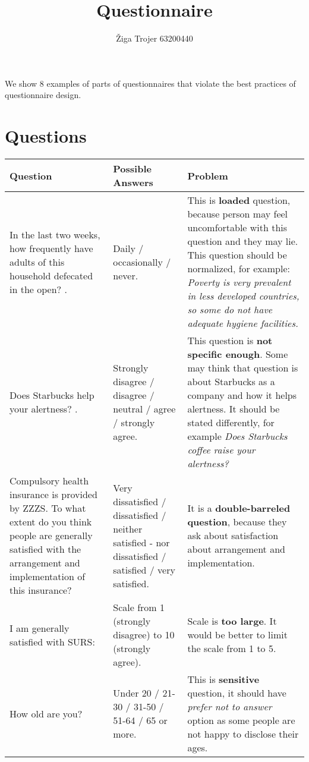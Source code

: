 \documentclass[9pt, journal,onecolumn]{IEEEtran}
\title{\vspace{0ex}
Questionnaire
}
\author{Žiga Trojer\vspace{-4.0ex} 63200440}
\begin{document}
\maketitle
We show 8 examples of parts of questionnaires that violate the best practices of questionnaire design.

\section*{Questions}


\begin{tabularx}{\textwidth}{X|X|X}
  \textbf{Question} & \textbf{Possible Answers } & \textbf{Problem}  \\
\hline
In the last two weeks, how frequently have adults of this household defecated in the open? \cite[p. 48]{wsp}. 
&  Daily / occasionally / never. & This is \textbf{loaded} question, because person may feel uncomfortable with this question and they may lie. This question should be normalized, for example: \textit{Poverty is very prevalent in less developed countries, so some do not have adequate hygiene facilities.}\\ \hline


Does Starbucks help your alertness?  \cite{starbucks}. 
&  Strongly disagree / disagree / neutral / agree / strongly agree. & This question is \textbf{not specific enough}. Some may think that question is about Starbucks as a company and how it helps alertness. It should be stated differently, for example \textit{Does Starbucks coffee raise your alertness?}\\ \hline

Compulsory health insurance is provided by ZZZS. To what extent do you think people are generally satisfied with the arrangement and implementation of this insurance? \cite{zzzs} & Very dissatisfied / dissatisfied / neither satisfied - nor dissatisfied / satisfied / very satisfied. & It is a \textbf{double-barreled question}, because they ask about satisfaction about arrangement and implementation. \\ \hline

I am generally satisfied with SURS: \cite{surs} & Scale from 1 (strongly disagree) to 10 (strongly agree).   &  Scale is \textbf{too large}. It would be better to limit the scale from 1 to 5.\\ \hline

How old are you? \cite{sz}& Under 20 / 21-30 / 31-50 / 51-64 / 65 or more. & This is \textbf{sensitive} question,  it should have \textit{prefer not to answer} option as some people are not happy to disclose their ages.  \\ \hline


\end{tabularx}
\end{document}
